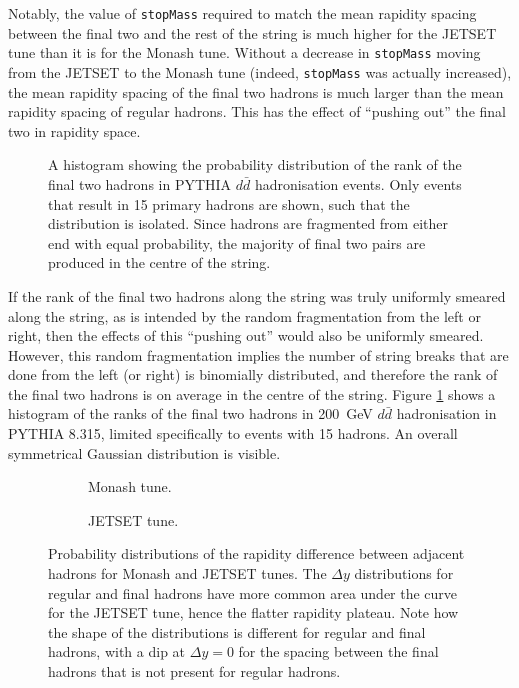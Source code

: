 \documentclass[12pt,a4paper]{report}
\begin{document}
Notably, the value of \texttt{stopMass} required to match the mean rapidity spacing between the final two and the rest of the string is much higher for the JETSET tune than it is for the Monash tune. Without a decrease in \texttt{stopMass} moving from the JETSET to the Monash tune (indeed, \texttt{stopMass} was actually increased), the mean rapidity spacing of the final two hadrons is much larger than the mean rapidity spacing of regular hadrons. This has the effect of ``pushing out'' the final two in rapidity space.

\begin{figure}
  \centering
  
  \caption{A histogram showing the probability distribution of the rank of the final two hadrons in PYTHIA $d\bar{d}$ hadronisation events. Only events that result in 15 primary hadrons are shown, such that the distribution is isolated. Since hadrons are fragmented from either end with equal probability, the majority of final two pairs are produced in the centre of the string.}
  \label{fig:finaltworanks}
\end{figure}

If the rank of the final two hadrons along the string was truly uniformly smeared along the string, as is intended by the random fragmentation from the left or right, then the effects of this ``pushing out'' would also be uniformly smeared. However, this random fragmentation implies the number of string breaks that are done from the left (or right) is binomially distributed, and therefore the rank of the final two hadrons is on average in the centre of the string. Figure \ref{fig:finaltworanks} shows a histogram of the ranks of the final two hadrons in \qty{200}{\giga\electronvolt} $d\bar{d}$ hadronisation in PYTHIA 8.315, limited specifically to events with 15 hadrons. An overall symmetrical Gaussian distribution is visible.

\begin{figure}
  \centering
  \begin{subfigure}{0.48\linewidth}
    \centering
    
    \caption{Monash tune.}
    \label{fig:deltay-compare-monash}
  \end{subfigure}
  \hfill
  \begin{subfigure}{0.48\linewidth}
    \centering
    
    \caption{JETSET tune.}
    \label{fig:deltay-compare-jetset}
  \end{subfigure}
  \caption{Probability distributions of the rapidity difference between adjacent hadrons for Monash and JETSET tunes. The $\Delta y$ distributions for regular and final hadrons have more common area under the curve for the JETSET tune, hence the flatter rapidity plateau. Note how the shape of the distributions is different for regular and final hadrons, with a dip at $\Delta y = 0$ for the spacing between the final hadrons that is not present for regular hadrons.}
  \label{fig:deltay-compare}
\end{figure}
\end{document}
